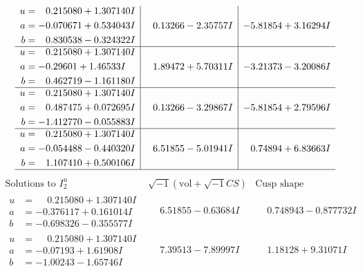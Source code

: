 \documentclass[1p]{elsarticle_modified}
\theoremstyle{definition}
\newcommand{\I}{\sqrt{-1}}
\begin{document}
$$\begin{array}{c|c|c}
\begin{aligned}
u &= \phantom{-}0.215080 + 1.307140 I \\
a &= -0.070671 + 0.534043 I \\
b &= \phantom{-}0.830538 - 0.324322 I\end{aligned}
 & \phantom{-}0.13266 - 2.35757 I & -5.81854 + 3.16294 I \\ \hline\begin{aligned}
u &= \phantom{-}0.215080 + 1.307140 I \\
a &= -0.29601 + 1.46533 I \\
b &= \phantom{-}0.462719 - 1.161180 I\end{aligned}
 & \phantom{-}1.89472 + 5.70311 I & -3.21373 - 3.20086 I \\ \hline\begin{aligned}
u &= \phantom{-}0.215080 + 1.307140 I \\
a &= \phantom{-}0.487475 + 0.072695 I \\
b &= -1.412770 - 0.055883 I\end{aligned}
 & \phantom{-}0.13266 - 3.29867 I & -5.81854 + 2.79596 I \\ \hline\begin{aligned}
u &= \phantom{-}0.215080 + 1.307140 I \\
a &= -0.054488 - 0.440320 I \\
b &= \phantom{-}1.107410 + 0.500106 I\end{aligned}
 & \phantom{-}6.51855 - 5.01941 I & \phantom{-}0.74894 + 6.83663 I\\
 \hline 
 \end{array}$$\newpage$$\begin{array}{c|c|c}  
\text{Solutions to }I^u_{2}& \I (\text{vol} + \sqrt{-1}CS) & \text{Cusp shape}\\
 \hline 
\begin{aligned}
u &= \phantom{-}0.215080 + 1.307140 I \\
a &= -0.376117 + 0.161014 I \\
b &= -0.698326 - 0.355577 I\end{aligned}
 & \phantom{-}6.51855 - 0.63684 I & \phantom{-}0.748943 - 0.877732 I \\ \hline\begin{aligned}
u &= \phantom{-}0.215080 + 1.307140 I \\
a &= -0.07193 + 1.61908 I \\
b &= -1.00243 - 1.65746 I\end{aligned}
 & \phantom{-}7.39513 - 7.89997 I & \phantom{-}1.18128 + 9.31071 I \\ \hline\begin{aligned}

\end{aligned}
\end{array}$$
\end{document}
